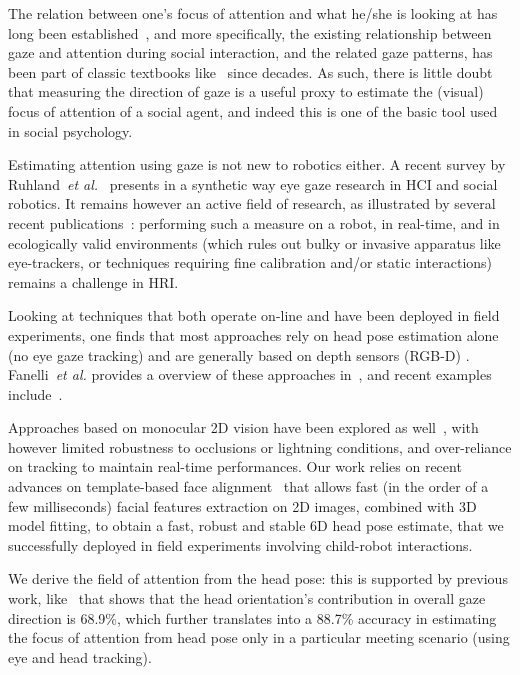 \documentclass{sig-alternate}
\newcommand{\etal}{\textit{et al.}\xspace}
\begin{document}
The relation between one's focus of attention and what he/she is looking at has
long been established~\cite{yarbus1967eye,barber1976perception}, and more
specifically, the existing relationship between gaze and attention during social
interaction, and the related gaze patterns, has been part of classic textbooks
like~\cite{argyle1969social} since decades. As such, there is little doubt that
measuring the direction of gaze is a useful proxy to estimate the (visual) focus
of attention of a social agent, and indeed this is one of the basic tool used in
social psychology.

Estimating attention using gaze is not new to robotics either. A
recent survey by Ruhland~\etal~\cite{ruhland2015review} presents in a synthetic
way eye gaze research in HCI and social robotics. It remains however an active field of research, as illustrated by
several recent publications~\cite{baxter2014tracking,anzalone,kennedy2015head}:
performing such a measure on a robot, in real-time, and in ecologically
valid environments (which rules out bulky or invasive apparatus like
eye-trackers, or techniques requiring fine calibration and/or static
interactions) remains a challenge in HRI.

Looking at techniques that both operate on-line and have been deployed in field
experiments, one finds that most approaches rely on head pose estimation alone
(no eye gaze tracking) and are generally based on depth sensors (RGB-D) .
Fanelli~\etal provides a overview of these approaches in~\cite{fanelli2012real},
and recent examples include~\cite{baxter2014tracking, anzalone}.

Approaches based on monocular 2D vision have been explored as
well~\cite{peters2010investigating}, with however limited robustness to
occlusions or lightning conditions, and over-reliance on tracking to maintain
real-time performances.  Our work relies on recent advances on template-based
face alignment~\cite{kazemi2014one} that allows fast (in the order of a few
milliseconds) facial features extraction on 2D images, combined with 3D model
fitting, to obtain a fast, robust and stable 6D head pose estimate, that we
successfully deployed in field experiments involving child-robot interactions.

We derive the field of attention from the head pose: this is supported by
previous work, like~\cite{stiefelhagen2002tracking} that shows that the head orientation's contribution in
overall gaze direction is 68.9\%, which further translates into a 88.7\%
accuracy in estimating the focus of attention from head pose only in a
particular meeting scenario (using eye and head tracking).
\end{document}
